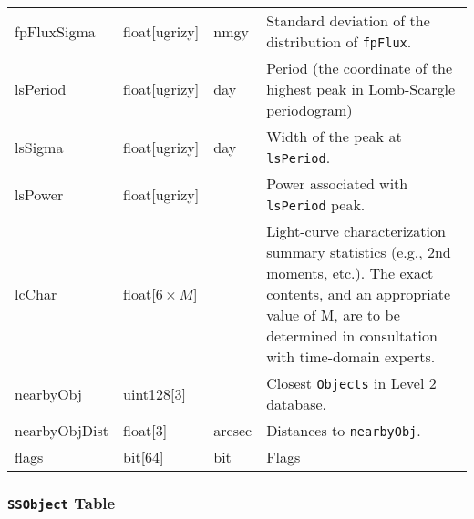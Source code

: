 \documentclass[12pt]{article}
\newcommand{\code}[1]{\texttt{#1}}
\newcommand{\DR}{{Level 2 database}\xspace}
\newcommand{\Objects}{\code{Objects}\xspace}
\newcommand{\SSObject}{\code{SSObject}\xspace}
\begin{document}
\begin{center}
\begin{longtable}{p{3cm}p{2cm}p{2cm}p{5cm}}
fpFluxSigma & float[ugrizy] & nmgy & Standard deviation of the distribution of {\tt fpFlux}. \\ 

lsPeriod  & float[ugrizy] & day & Period (the coordinate of the highest peak in Lomb-Scargle periodogram) \\

lsSigma  & float[ugrizy] & day & Width of the peak at \texttt{lsPeriod}. \\

lsPower   & float[ugrizy] & ~ & Power associated with \texttt{lsPeriod} peak. \\

lcChar   & float[$6\times{}M$] & ~ & Light-curve characterization summary statistics (e.g., 2nd moments, etc.). The exact contents, and an appropriate value of M, are to be determined in consultation with time-domain experts. \\

nearbyObj   & uint128[3] & ~ & Closest \Objects in \DR. \\

nearbyObjDist   & float[3] & arcsec & Distances to \texttt{nearbyObj}. \\

flags & bit[64] & bit & Flags \\ \hline

\end{longtable}
\end{center}

\subsubsection{\SSObject Table}
\end{document}
